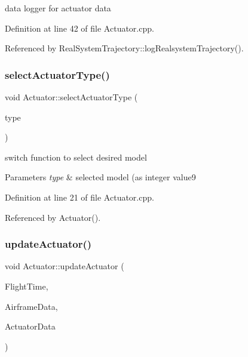 data logger for actuator data 



Definition at line 42 of file Actuator.\+cpp.



Referenced by Real\+System\+Trajectory\+::log\+Realsystem\+Trajectory().

\mbox{\label{class_actuator_a9276e545f7378225f4efab89014a90a7}} 
\subsubsection{\texorpdfstring{select\+Actuator\+Type()}{selectActuatorType()}}
{\footnotesize\ttfamily void Actuator\+::select\+Actuator\+Type (\begin{DoxyParamCaption}\item[{int}]{type }\end{DoxyParamCaption})}



switch function to select desired model 


\begin{DoxyParams}{Parameters}
{\em type} & selected model (as integer value9 \\
\hline
\end{DoxyParams}


Definition at line 21 of file Actuator.\+cpp.



Referenced by Actuator().

\mbox{\label{class_actuator_a63aacfd84f07a1beb097b117b818c30f}} 
\subsubsection{\texorpdfstring{update\+Actuator()}{updateActuator()}}
{\footnotesize\ttfamily void Actuator\+::update\+Actuator (\begin{DoxyParamCaption}\item[{\hyperlink{group___tools_ga3f1431cb9f76da10f59246d1d743dc2c}{Float64}}]{Flight\+Time,  }\item[{Airframe\+Struct \&}]{Airframe\+Data,  }\item[{Actuator\+Struct \&}]{Actuator\+Data }\end{DoxyParamCaption})}



